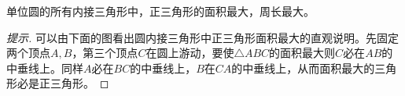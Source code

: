 \begin{theorem}
  单位圆的所有内接三角形中，正三角形的面积最大，周长最大。
\end{theorem}
\begin{proof}[提示]
  
    

  可以由下面的图看出圆内接三角形中正三角形面积最大的直观说明。先固定两个顶点$A,B$，第三个顶点$C$在圆上游动，要使$\triangle ABC$的面积最大则$C$必在$AB$的中垂线上。同样$A$必在$BC$的中垂线上，$B$在$CA$的中垂线上，从而面积最大的三角形必是正三角形。


\end{proof}
